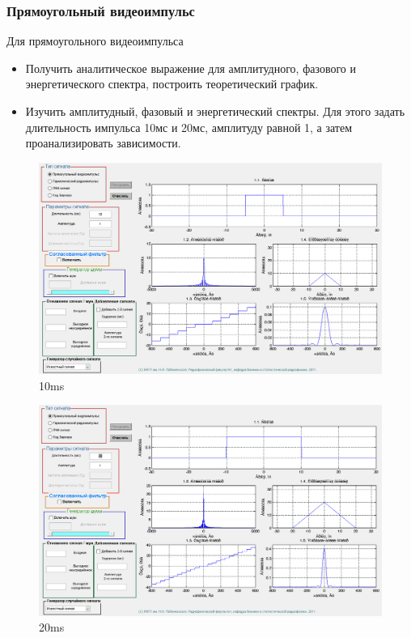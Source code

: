\subsubsection{Прямоугольный видеоимпульс}
Для прямоугольного видеоимпульса
\begin{itemize}
    \item Получить аналитическое выражение для амплитудного, фазового и
    энергетического спектра, построить теоретический график.
    \item Изучить амплитудный, фазовый и энергетический спектры. Для этого
    задать длительность импульса 10мс и 20мс, амплитуду равной 1, а затем
    проанализировать зависимости.
\end{itemize}

\begin{figure}[H]
    \centering
    \includegraphics[width=0.9\linewidth]{imgs/t1s1_10.png}
    \caption{10ms}
    \label{fig:task1_10}
\end{figure}
\begin{figure}[H]
    \centering
    \includegraphics[width=0.9\linewidth]{imgs/t1s1_20.png}
    \caption{20ms}
    \label{fig:task1_20}
\end{figure}


